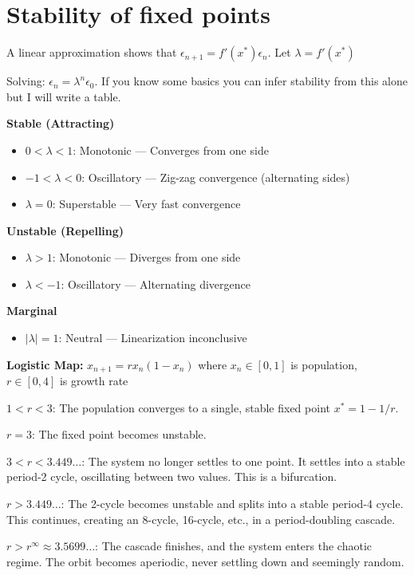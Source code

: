 \section*{Stability of fixed points}

A linear approximation shows that $\epsilon_{n+1} = f'(x^*)\epsilon_n$. Let $\lambda = f'(x^*)$

Solving: $\epsilon_n = \lambda^n \epsilon_0$. If you know some basics you can 
infer stability from this alone but I will write a table.

\begin{tightitemize}
  \item \textbf{Stable (Attracting)}
  \begin{itemize}
    \item $0 < \lambda < 1$: Monotonic — Converges from one side
    \item $-1 < \lambda < 0$: Oscillatory — Zig-zag convergence (alternating sides)
    \item $\lambda = 0$: Superstable — Very fast convergence
  \end{itemize}

  \item \textbf{Unstable (Repelling)}
  \begin{itemize}
    \item $\lambda > 1$: Monotonic — Diverges from one side
    \item $\lambda < -1$: Oscillatory — Alternating divergence
  \end{itemize}

  \item \textbf{Marginal}
  \begin{itemize}
    \item $|\lambda| = 1$: Neutral — Linearization inconclusive
  \end{itemize}
\end{tightitemize}

\textbf{Logistic Map:} $x_{n+1} = r x_n (1 - x_n)$ where $x_n \in [0, 1]$ is 
population, $r \in [0, 4]$ is growth rate

\begin{tightitemize}
    \item $1<r<3$: The population converges to a single, stable fixed point $x^*=1-1/r$.
    \item $r=3$: The fixed point becomes unstable.
    \item $3<r<3.449\dots$: The system no longer settles to one point. It settles into a stable period-2 cycle, oscillating between two values. This is a bifurcation.
    \item $r>3.449\dots$: The 2-cycle becomes unstable and splits into a stable period-4 cycle. This continues, creating an 8-cycle, 16-cycle, etc., in a period-doubling cascade.
    \item $r>r^{\infty} \approx 3.5699\dots$: The cascade finishes, and the system enters the chaotic regime. The orbit becomes aperiodic, never settling down and seemingly random.
\end{tightitemize}

